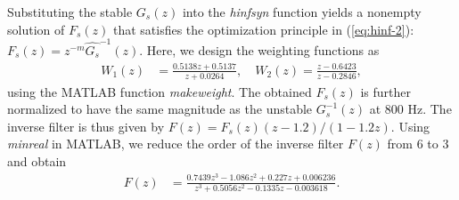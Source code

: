 \documentclass [11pt, proquest] {uwthesis}[2020/02/24]
\begin{document}
Substituting the stable $G_{s}(z)$ into the \emph{hinfsyn }function
yields a nonempty solution of $F_{s}(z)$ that satisfies the optimization
principle in (\ref{eq:hinf-2}): $F_{s}(z)=z^{-m}\hat{G_{s}}^{-1}(z)$.
Here, we design the weighting functions as
\begin{align*}
W_{1}(z) & =\frac{0.5138z+0.5137}{z+0.0264},\quad W_{2}(z)=\frac{z-0.6423}{z-0.2846},
\end{align*}
using the MATLAB function \emph{makeweight}. The obtained $F_{s}(z)$
is further normalized to have the same magnitude as the unstable $G_{s}^{-1}(z)$
at 800 Hz. The inverse filter is thus given by $F(z)=F_{s}(z)(z-1.2)/(1-1.2z).$
Using \emph{minreal} in MATLAB, we reduce the order of the inverse
filter $F(z)$ from 6 to 3 and obtain
\begin{align*}
F(z) & =\frac{0.7439z^{3}-1.086z^{2}+0.227z+0.006236}{z^{3}+0.5056z^{2}-0.1335z-0.003618}.
\end{align*}
\end{document}
